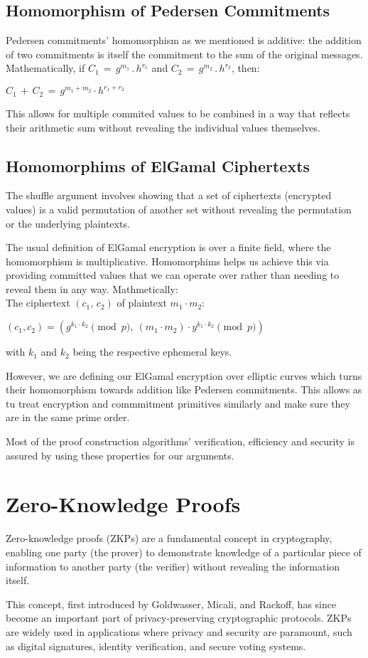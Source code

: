 \documentclass[12pt,a4paper]{report}
\begin{document}
\subsection*{Homomorphism of Pedersen Commitments}
Pedersen commitments' homomorphism as we mentioned is additive: the addition of two commitments is itself the commitment to the sum of the original messages.
Mathematically, if $C_1\,=\,g^{m_1}\,.\,h^{r_1}$ and $C_2\,=\,g^{m_2}\,.\,h^{r_2}$, then:\\ 
\begin{center}
$C_1\,+\,C_2\,=\,g^{m_1 + m_2} \cdot h ^{r_1 + r_2}$
\end{center}
This allows for multiple commited values to be combined in a way that reflects their arithmetic sum without revealing the individual values themselves.
\subsection*{Homomorphims of ElGamal Ciphertexts}
The shuffle argument involves showing that a set of ciphertexts (encrypted values) is a valid permutation of another set without revealing the permutation or the underlying plaintexts.\par
The usual definition of ElGamal encryption is over a finite field, where the homomorphism is multiplicative.
Homomorphims helps us achieve this via providing committed values that we can operate over rather than needing to reveal them in any way. Mathmetically:\\
The ciphertext $(c_1,\,c_2)$ of plaintext $m_1 \cdot m_2$:\\
\begin{center}
$(c_1, c_2) = \left( g^{k_1 \cdot k_2} \pmod p, \ (m_1 \cdot m_2) \cdot y^{k_1 \cdot k_2} \pmod p \right)$
\end{center}
with $k_1$ and $k_2$ being the respective ephemeral keys.\par
However, we are defining our ElGamal encryption over elliptic curves which turns their homomorphism towards addition like Pedersen commitments. This allows as tu treat encryption and commmitment primitives similarly and make sure they are in the same prime order.\par
Most of the proof construction algorithms' verification, efficiency and security is assured by using these properties for our arguments.

\section{Zero-Knowledge Proofs}
Zero-knowledge proofs (ZKPs) are a fundamental concept in cryptography, enabling one party 
(the prover) to demonstrate knowledge of a particular piece of information to another party 
(the verifier) without revealing the information itself.\par
This concept, first introduced by Goldwasser, Micali, and Rackoff\cite{zk}, has since become 
an important part of privacy-preserving cryptographic protocols. 
ZKPs are widely used in applications where privacy and security are paramount, 
such as digital signatures, identity verification, and secure voting systems.
\end{document}

